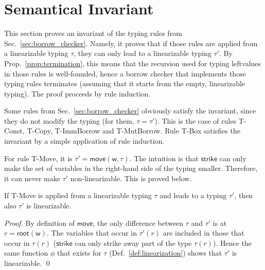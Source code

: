 \section{Semantical Invariant}\label{sec:invariant}

This section proves an invariant of the typing rules
from Sec.~\ref{sec:borrow_checker}. Namely, it proves that
if those rules are applied from a linearizable typing $\tau$,
they can only lead to a linearizable typing $\tau'$.
By Prop.~\ref{prop:termination}, this means that the recursion used for
typing leftvalues in those rules is well-founded,
hence a borrow checker that implements those typing rules terminates
(assuming that it starts from the empty, linearizable typing).
The proof proceeds by rule induction.

Some rules from Sec.~\ref{sec:borrow_checker} obviously satisfy the invariant,
since they do not modify the typing (for them, $\tau=\tau'$).
This is the case of rules
\textsf{T-Const}, \textsf{T-Copy}, \textsf{T-ImmBorrow} and
\textsf{T-MutBorrow}.
Rule \textsf{T-Box} satisfies the invariant by a simple application of
rule induction.

For rule \textsf{T-Move}, it is $\tau'=\mathsf{move}(\mathsf{w},\tau)$.
The intuition is that
$\mathsf{strike}$ can only make the set of variables in the right-hand side
of the typing smaller. Therefore, it can never make $\tau'$
non-linearizable. This is proved below.

\begin{lemma}\label{lem:move_invariant}
  If \textsf{T-Move} is applied from a linearizable typing $\tau$
  and leads to a typing $\tau'$, then also $\tau'$ is linearizable.
\end{lemma}
\begin{proof}
  By definition of $\mathsf{move}$, the only
  difference between $\tau$ and $\tau'$ is at $r=\mathsf{root}(\mathsf{w})$.
  The variables that occur in $\tau'(r)$ are included in those that occur
  in $\tau(r)$ ($\mathsf{strike}$ can only strike away part of the type $\tau(r)$).
  Hence the same function $\phi$ that exists for $\tau$ (Def.~\ref{def:linearization})
  shows that $\tau'$ is linearizable.
  \qed
\end{proof}

